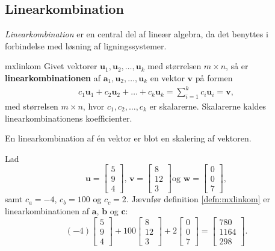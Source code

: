 \subsection{Linearkombination}
%
\textit{Linearkombination} er en central del af lineær algebra, da det benyttes i forbindelse med løsning af ligningssystemer. 
%
\begin{defn}{}{mxlinkom}
Givet vektorer $\mathbf{u}_1, \mathbf{u}_2, \ldots, \mathbf{u}_k$ med størrelsen $m \times n$, så er \textbf{linearkombinationen} af $\mathbf{a}_1, \mathbf{u}_2, \ldots, \mathbf{u}_k$ en vektor $\mathbf{v}$ på formen 
%
\begin{align*}
c_1\mathbf{u}_1+c_2\mathbf{u}_2+\ldots+c_k\mathbf{u}_k=\sum\limits_{i=1}^k c_i\mathbf{u}_i=\mathbf{v},
\end{align*}
%
med størrelsen $m \times n$, hvor $c_1, c_2, \ldots, c_k$ er skalarerne.
Skalarerne kaldes linearkombinationens koefficienter.
\end{defn}
%
%
\noindent 
%
En linearkombination af én vektor er blot en skalering af vektoren.
\\
%
%
\begin{eks}
Lad 
$$
\textbf{u}=
\begin{bmatrix}
5 \\
9 \\
4
\end{bmatrix}
\text{, }
\textbf{v}=
\begin{bmatrix}
8  \\
12 \\ 
3
\end{bmatrix}
\text{og }
\textbf{w}=
\begin{bmatrix}
0 \\
0 \\
7
\end{bmatrix},
$$
samt $c_a=-4$, $c_b=100$ og $c_c=2$. 
Jævnfør definition \ref{defn:mxlinkom} er linearkombinationen af $\textbf{a}$, $\textbf{b}$ og $\textbf{c}$:
$$
(-4)
\begin{bmatrix}
5 \\ 
9 \\ 
4
\end{bmatrix}
+
100
\begin{bmatrix}
8 \\
12 \\ 
3
\end{bmatrix}
+
2
\begin{bmatrix}
0 \\
0 \\ 
7
\end{bmatrix}
=
\begin{bmatrix}
780 \\
1164 \\ 
298
\end{bmatrix}
\text{.}
$$
\end{eks}
